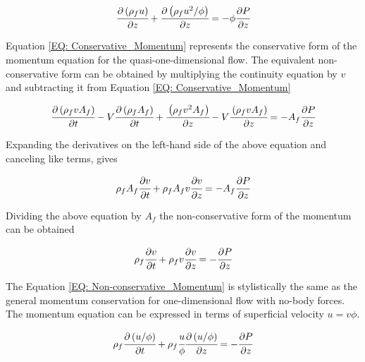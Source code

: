 \documentclass[../Article_Design_of_Experiment.tex]{subfiles}
\begin{document}
	{\footnotesize
		\begin{equation}
			\cfrac{\partial \left( \rho_f u \right)}{\partial z} + \cfrac{\partial \left( \rho_f u^2/\phi \right) }{\partial z} = -\phi \cfrac{\partial 	P}{\partial z}
		\end{equation}
	}

	Equation \ref{EQ: Conservative_Momentum} represents the conservative form of the momentum equation for the quasi-one-dimensional flow. The equivalent non-conservative form can be obtained by multiplying the continuity equation by $v$ and subtracting it from Equation \ref{EQ: Conservative_Momentum}
	
	{\footnotesize
		\begin{equation}
			\cfrac{\partial \left( \rho_f v A_f \right)}{\partial t} - V\cfrac{ \partial \left( \rho_f A_f \right) }{\partial t} + \cfrac{\left( \rho_f v^2 A_f 	\right)}{\partial z} - V \cfrac{\left( \rho_f v A_f \right)}{\partial z} = -A_f \cfrac{\partial P}{\partial z}
		\end{equation}
	}
	
	Expanding the derivatives on the left-hand side of the above equation and canceling like terms, gives

	{\footnotesize
		\begin{equation}
			\rho_f A_f \cfrac{\partial v}{\partial t} + \rho_f A_f v \cfrac{\partial v}{\partial z} = -A_f \cfrac{\partial P}{\partial z}
		\end{equation}
	}

	Dividing the above equation by $A_f$ the non-conservative form of the momentum can be obtained
	
	{\footnotesize
		\begin{equation}
			\rho_f \cfrac{\partial v}{\partial t} + \rho_f v \cfrac{\partial v}{\partial z} = -\cfrac{\partial P}{\partial z}
			\label{EQ: Non-conservative_Momentum}
		\end{equation}
	}

	The Equation \ref{EQ: Non-conservative_Momentum} is stylistically the same as the general momentum conservation for one-dimensional flow with no-body forces. The momentum equation can be expressed in terms of superficial velocity $u=v\phi$. 
	
	{\footnotesize
		\begin{equation}
			\rho_f \cfrac{\partial \left(u / \phi \right)}{\partial t} + \rho_f \cfrac{u}{\phi} \cfrac{\partial \left( u / \phi \right)}{\partial z} = - \cfrac{\partial P}{\partial z}
		\end{equation}
	}
\end{document}

